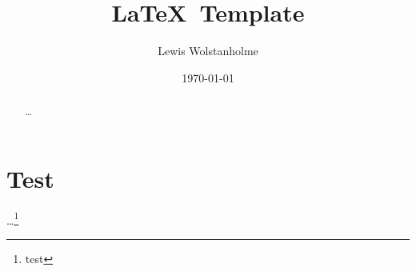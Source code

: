 \documentclass[a4paper, 11pt]{article}
\begin{document}
	
	\title{\LaTeX~Template}
	\author{Lewis Wolstanholme}
	\date{\getDate\today}
	\maketitle





	
	\begin{abstract}
		\dots
	\end{abstract}
	
	
	
	\section{Test}
	\dots\footnote{test}




	\cleardoublepage{}
	\raggedright
	
\end{document}
